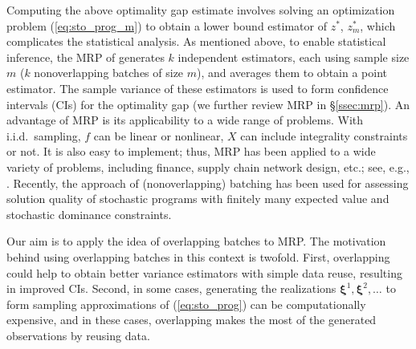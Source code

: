 \documentclass[12pt]{article}
\newcommand{\X}{X}
\newcommand{\x}{\mathbf{x}}
\newcommand{\xh}{{\hat{\x}}}
\newcommand{\xit}{\boldsymbol{\xi}}
\newcommand{\zs}{z^*}
\begin{document}
Computing the above optimality gap estimate involves solving an optimization problem (\ref{eq:sto_prog_m}) to obtain a lower bound estimator of $\zs$, $\zs_m$, which complicates the statistical analysis. 
As mentioned above, to enable statistical inference, the MRP of \citet{Mak1999} generates $k$ independent estimators, each using sample size $m$ ($k$ nonoverlapping batches of size $m$), and averages them to obtain a point estimator.  
The sample variance of these estimators is used to form confidence intervals (CIs) for the optimality gap (we further review MRP in \S \ref{ssec:mrp}).  
An advantage of MRP is its applicability to a wide range of problems.  
With i.i.d.\ sampling, $f$ can be linear or nonlinear, $\X$ can include integrality constraints or not.  
It is also easy to implement; thus, MRP has been applied to a wide variety of problems, including finance, supply chain network design, etc.; see, e.g., \citep{bertocchi_etal_99,janjarassuk_linderoth_08,santoso_ahmed_etal_05}.  
Recently, the approach of (nonoverlapping) batching has been used for assessing solution quality of stochastic programs with finitely many expected value \citep{wang_ahmed_08} and stochastic dominance \citep{hu2010sample} constraints.



Our aim is to apply the idea of overlapping batches to MRP.  
The motivation behind using overlapping batches in this context is twofold. 
First, overlapping could help to obtain better variance estimators with simple data reuse, resulting in improved CIs.
Second, in some cases, generating the realizations $\xit^1, \xit^2, \dots$ to form sampling approximations of (\ref{eq:sto_prog}) can be computationally expensive, and in these cases, overlapping makes the most of the generated observations by reusing data. 
\end{document}
